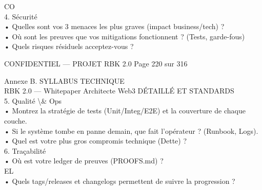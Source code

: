 CO\\
4. Sécurité\\
\vspace{0.5em}
• Quelles sont vos 3 menaces les plus graves (impact business/tech) ?\\
\vspace{0.5em}
• Où sont les preuves que vos mitigations fonctionnent ? (Tests, garde-fous)\\
\vspace{0.5em}
• Quels risques résiduels acceptez-vous ?\\
\vspace{0.5em}
\vspace{0.5em}
\vspace{0.5em}
\vspace{0.5em}
\begin{confidential}CONFIDENTIEL — PROJET RBK 2.0                                Page 220 sur 316\end{confidential}
Annexe B. SYLLABUS TECHNIQUE\\
RBK 2.0 — Whitepaper Architecte Web3                                                                             DÉTAILLÉ ET STANDARDS\\
\vspace{0.5em}
\vspace{0.5em}
5. Qualité \textbackslash{}& Ops\\
\vspace{0.5em}
• Montrez la stratégie de tests (Unit/Integ/E2E) et la couverture de chaque couche.\\
\vspace{0.5em}
• Si le système tombe en panne demain, que fait l’opérateur ? (Runbook, Logs).\\
\vspace{0.5em}
• Quel est votre plus gros compromis technique (Dette) ?\\
\vspace{0.5em}
6. Traçabilité\\
\vspace{0.5em}
• Où est votre ledger de preuves (PROOFS.md) ?\\
\vspace{0.5em}
\vspace{0.5em}
\vspace{0.5em}
\vspace{0.5em}
EL\\
• Quels tags/releases et changelogs permettent de suivre la progression ?\\
\vspace{0.5em}
